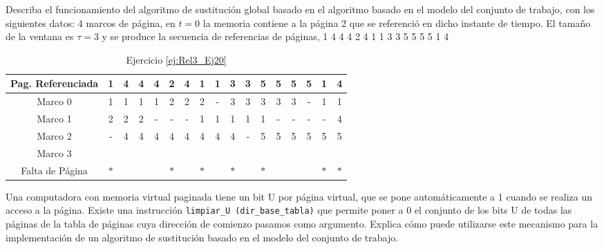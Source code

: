 \begin{ejercicio} \label{ej:Rel3_Ej20}
    Describa el funcionamiento del algoritmo de sustitución global basado en el algoritmo
basado en el modelo del conjunto de trabajo, con los siguientes datos: 4 marcos de
página, en $t= 0$ la memoria contiene a la página 2 que se referenció en dicho instante de
tiempo. El tamaño de la ventana es $\tau=3$ y se produce la secuencia de referencias de
páginas, 1 4 4 4 2 4 1 1 3 3 5 5 5 5 1 4
    \begin{table}[H]
        \centering
        \begin{tabular}{|c|c|c|c|c|c|c|c|c|c|c|c|c|c|c|c|c|}
        Pag. Referenciada & 1 & 4 & 4 & 4 & 2 & 4 & 1 & 1 & 3 & 3 & 5 & 5 & 5 & 5 & 1 & 4 \\ \hline \hline
        Marco 0           & 1 & 1 & 1 & 1 & 2 & 2 & 2 & - & 3 & 3 & 3 & 3 & 3 & - & 1 & 1 \\ \hline
        Marco 1           & 2 & 2 & 2 & - & - & - & 1 & 1 & 1 & 1 & 1 & - & - & - & - & 4 \\ \hline
        Marco 2           & - & 4 & 4 & 4 & 4 & 4 & 4 & 4 & 4 & - & 5 & 5 & 5 & 5 & 5 & 5 \\ \hline
        Marco 3           &   &   &   &   &   &   &   &   &   &   &   &   &   &   &   &   \\ \hline \hline
        Falta de Página   & $\ast$ &   &   &   & $\ast$ &   & $\ast$ &   & $\ast$ &   & $\ast$ &   &   &   & $\ast$ & $\ast$
        \end{tabular}
        \caption{Ejercicio \ref{ej:Rel3_Ej20}}
        \label{tab:Rel3_Ej20}
    \end{table}
\end{ejercicio}



\begin{ejercicio}
    Una computadora con memoria virtual paginada tiene un bit U por página virtual, que se
pone automáticamente a 1 cuando se realiza un acceso a la página. Existe una
instrucción \verb|limpiar_U (dir_base_tabla)| que permite poner a 0 el conjunto de los bits U de
todas las páginas de la tabla de páginas cuya dirección de comienzo pasamos como
argumento. Explica cómo puede utilizarse este mecanismo para la implementación de un
algoritmo de sustitución basado en el modelo del conjunto de trabajo.
\end{ejercicio}


